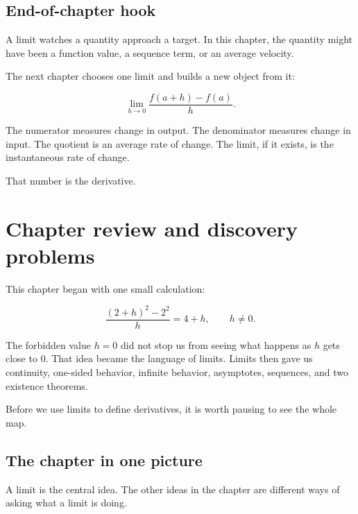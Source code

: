 \subsection{End-of-chapter hook}
\label{subsec:chapter3-hook-to-derivative}

A limit watches a quantity approach a target.  In this chapter, the quantity might have been a function value, a sequence term, or an average velocity.

The next chapter chooses one limit and builds a new object from it:

\[
\lim_{h\to0}\frac{f(a+h)-f(a)}{h}.
\]

The numerator measures change in output.  The denominator measures change in input.  The quotient is an average rate of change.  The limit, if it exists, is the instantaneous rate of change.

That number is the derivative.
\section{Chapter review and discovery problems}
\label{sec:chapter3-review-discovery}

This chapter began with one small calculation:

\[
\frac{(2+h)^2-2^2}{h}=4+h,
\qquad h\neq0.
\]

The forbidden value \(h=0\) did not stop us from seeing what happens as \(h\) gets close to \(0\).  That idea became the language of limits.  Limits then gave us continuity, one-sided behavior, infinite behavior, asymptotes, sequences, and two existence theorems.

Before we use limits to define derivatives, it is worth pausing to see the whole map.

\subsection{The chapter in one picture}
\label{subsec:chapter3-one-picture}

A limit is the central idea.  The other ideas in the chapter are different ways of asking what a limit is doing.

